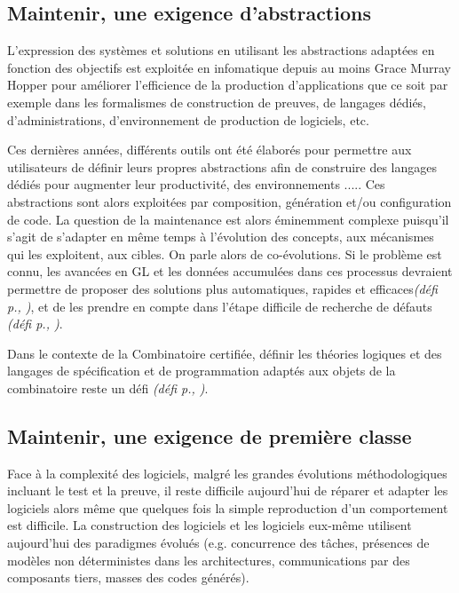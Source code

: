 \documentclass[11pt]{article}
\newcommand{\defi}[1]{\emph{(défi p.\pageref{#1}, \cite{#1})}}
\begin{document}
\subsection{Maintenir, une exigence d'abstractions \label{ss:maintenance:abstractions}}
L'expression des systèmes et solutions en utilisant les abstractions adaptées en fonction des objectifs 
est exploitée en infomatique depuis au moins Grace Murray Hopper \cite{DBLP:journals/sigcse/Gurer02} pour améliorer l'efficience de la production d'applications que ce soit par exemple dans les formalismes de construction de preuves, de langages dédiés, d'administrations, d'environnement de production de logiciels, etc.

Ces dernières années, différents outils ont été élaborés pour permettre aux utilisateurs de définir leurs  propres abstractions afin de construire des langages dédiés pour augmenter leur productivité, des environnements .....
Ces abstractions sont alors exploitées par composition, génération et/ou configuration de code. La question de la maintenance est alors éminemment complexe puisqu'il s'agit de s'adapter en même temps à l'évolution des concepts, aux mécanismes qui les exploitent, aux cibles. On parle alors de co-évolutions. Si le problème est connu, les avancées en GL et les données accumulées dans ces processus devraient permettre de proposer des solutions plus automatiques, rapides et efficaces\defi{coevolution}, et de les prendre en compte dans l'étape difficile de recherche de défauts \defi{debuggers}.

Dans le contexte de la Combinatoire certifiée, définir les théories logiques et des langages de spécification et de programmation adaptés aux objets de la combinatoire reste un défi \defi{combinatoire}.




\subsection{Maintenir, une exigence de première classe \label{ss:maintenance:debugger}}
Face à la complexité des logiciels, malgré les grandes évolutions méthodologiques incluant le test et la preuve, il reste difficile aujourd'hui de réparer et adapter les logiciels alors même que quelques fois la simple reproduction d'un comportement est difficile. La construction des logiciels et les 
logiciels eux-même utilisent aujourd'hui des paradigmes évolués (e.g. concurrence des tâches, présences de modèles  non déterministes dans les architectures, communications par des composants tiers, masses des codes générés). 
\end{document}
